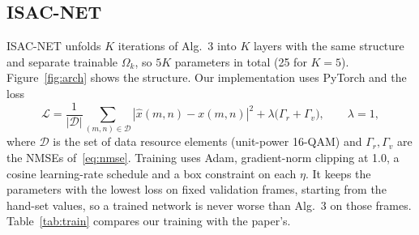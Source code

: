\documentclass[11pt,a4paper]{article}
\begin{document}
\subsection{ISAC-NET}
ISAC-NET unfolds $K$ iterations of Alg.~3 into $K$ layers with the same structure and separate trainable $\Omega_k$, so $5K$ parameters in total (25 for $K=5$). Figure~\ref{fig:arch} shows the structure. Our implementation uses PyTorch and the loss
\begin{equation}
  \mathcal{L}=\frac{1}{|\mathcal{D}|}\sum_{(m,n)\in\mathcal{D}}|\hat{x}(m,n)-x(m,n)|^2+\lambda\big(\Gamma_r+\Gamma_v\big),\qquad\lambda=1,
\end{equation}
where $\mathcal{D}$ is the set of data resource elements (unit-power 16-QAM) and $\Gamma_r,\Gamma_v$ are the NMSEs of~\eqref{eq:nmse}. Training uses Adam, gradient-norm clipping at 1.0, a cosine learning-rate schedule and a box constraint on each $\eta$. It keeps the parameters with the lowest loss on fixed validation frames, starting from the hand-set values, so a trained network is never worse than Alg.~3 on those frames. Table~\ref{tab:train} compares our training with the paper's.
\end{document}
